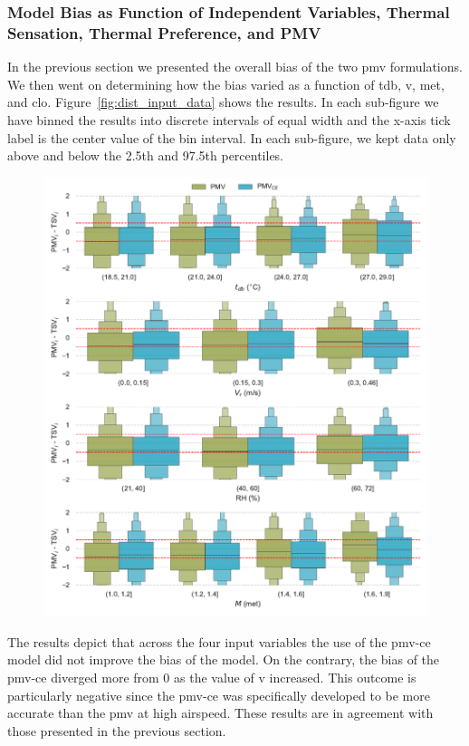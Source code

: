 \subsubsection{Model Bias as Function of Independent Variables, Thermal Sensation, Thermal Preference, and PMV}\label{subsec:model-bias-variable}
In the previous section we presented the overall bias of the two \ac{pmv} formulations.
We then went on determining how the bias varied as a function of \ac{tdb}, \ac{v}, \ac{met}, and \ac{clo}.
Figure~\ref{fig:dist_input_data} shows the results.
In each sub-figure we have binned the results into discrete intervals of equal width and the x-axis tick label is the center value of the bin interval. %
In each sub-figure, we kept data only above and below the 2.5th and 97.5th percentiles.
\begin{figure}[htb!]
    \centering
    \includegraphics[width=\textwidth]{figures/bias_models}
    \caption{}
    \label{fig:bias_models}
\end{figure}
The results depict that across the four input variables the use of the \gls{pmv-ce} model did not improve the bias of the model.
On the contrary, the bias of the \gls{pmv-ce} diverged more from 0 as the value of \ac{v} increased.
This outcome is particularly negative since the \gls{pmv-ce} was specifically developed to be more accurate than the \ac{pmv} at high airspeed.
These results are in agreement with those presented in the previous section.

